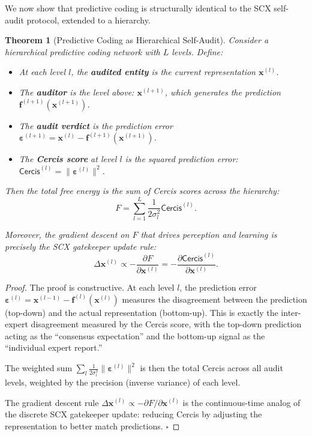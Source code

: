 \documentclass[12pt,a4paper]{article}
\newtheorem{theorem}{Theorem}[section]
\theoremstyle{remark}
\newcommand{\Cercis}{\textsf{Cercis}}
\newcommand{\FreeEnergy}{F}
\begin{document}
We now show that predictive coding is structurally identical to the SCX
self-audit protocol, extended to a hierarchy.

\begin{theorem}[Predictive Coding as Hierarchical Self-Audit]\label{thm:pc-audit}
Consider a hierarchical predictive coding network with $L$ levels. Define:

\begin{itemize}
    \item At each level $l$, the \textbf{audited entity} is the current representation $\mathbf{x}^{(l)}$.
    \item The \textbf{auditor} is the level above: $\mathbf{x}^{(l+1)}$, which generates the prediction $\mathbf{f}^{(l+1)}(\mathbf{x}^{(l+1)})$.
    \item The \textbf{audit verdict} is the prediction error $\boldsymbol{\varepsilon}^{(l+1)} = \mathbf{x}^{(l)} - \mathbf{f}^{(l+1)}(\mathbf{x}^{(l+1)})$.
    \item The \textbf{Cercis score} at level $l$ is the squared prediction error: $\Cercis^{(l)} = \|\boldsymbol{\varepsilon}^{(l)}\|^2$.
\end{itemize}

Then the total free energy is the sum of \Cercis{} scores across the hierarchy:
\begin{equation}\label{eq:pc-cercis}
    \FreeEnergy = \sum_{l=1}^{L} \frac{1}{2\sigma_l^2} \Cercis^{(l)}.
\end{equation}

Moreover, the gradient descent on $\FreeEnergy$ that drives perception and
learning is precisely the SCX gatekeeper update rule:
\begin{equation}\label{eq:pc-gatekeeper}
    \Delta \mathbf{x}^{(l)} \propto -\frac{\partial \FreeEnergy}{\partial \mathbf{x}^{(l)}} = -\frac{\partial \Cercis^{(l)}}{\partial \mathbf{x}^{(l)}}.
\end{equation}
\end{theorem}

\begin{proof}
The proof is constructive. At each level $l$, the prediction error
$\boldsymbol{\varepsilon}^{(l)} = \mathbf{x}^{(l-1)} - \mathbf{f}^{(l)}(\mathbf{x}^{(l)})$
measures the disagreement between the prediction (top-down) and the actual
representation (bottom-up). This is exactly the inter-expert disagreement
measured by the \Cercis{} score, with the top-down prediction acting as the
``consensus expectation'' and the bottom-up signal as the ``individual expert
report.''

The weighted sum $\sum_l \frac{1}{2\sigma_l^2} \|\boldsymbol{\varepsilon}^{(l)}\|^2$
is then the total \Cercis{} across all audit levels, weighted by the precision
(inverse variance) of each level.

The gradient descent rule $\Delta \mathbf{x}^{(l)} \propto -\partial \FreeEnergy
/ \partial \mathbf{x}^{(l)}$ is the continuous-time analog of the discrete
SCX gatekeeper update: reducing \Cercis{} by adjusting the representation to
better match predictions. $\square$
\end{proof}
\end{document}
